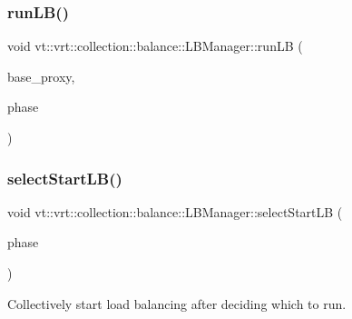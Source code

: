 \mbox{\label{structvt_1_1vrt_1_1collection_1_1balance_1_1_l_b_manager_a020cb9b702b65e1caee89994bdcb304e}} 
\subsubsection{\texorpdfstring{run\+L\+B()}{runLB()}}
{\footnotesize\ttfamily void vt\+::vrt\+::collection\+::balance\+::\+L\+B\+Manager\+::run\+LB (\begin{DoxyParamCaption}\item[{\hyperlink{structvt_1_1vrt_1_1collection_1_1balance_1_1_l_b_manager_a8b1a7735366beb85c2c2ccc3912cdd80}{L\+B\+Proxy\+Type}}]{base\+\_\+proxy,  }\item[{\hyperlink{namespacevt_a46ce6733d5cdbd735d561b7b4029f6d7}{Phase\+Type}}]{phase }\end{DoxyParamCaption})\hspace{0.3cm}{\ttfamily [protected]}}

\mbox{\label{structvt_1_1vrt_1_1collection_1_1balance_1_1_l_b_manager_aa21017c4513b87dccff2c3f0b12b00b4}} 
\subsubsection{\texorpdfstring{select\+Start\+L\+B()}{selectStartLB()}}
{\footnotesize\ttfamily void vt\+::vrt\+::collection\+::balance\+::\+L\+B\+Manager\+::select\+Start\+LB (\begin{DoxyParamCaption}\item[{\hyperlink{namespacevt_a46ce6733d5cdbd735d561b7b4029f6d7}{Phase\+Type}}]{phase }\end{DoxyParamCaption})}



Collectively start load balancing after deciding which to run. 


